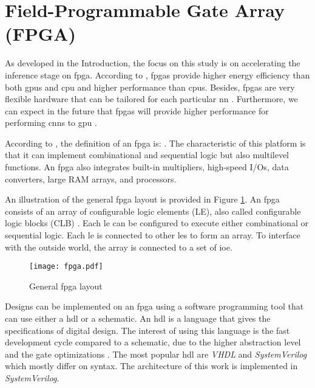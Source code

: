 \section{Field-Programmable Gate Array (FPGA)} \label{sec:fpga}
%
%
As developed in the Introduction, the focus on this study is on accelerating the inference stage on \acrshort{fpga}. According to \textcite{mittal_survey_2015}, \acrshort{fpga}s provide higher energy efficiency than both \acrshort{gpu}s and \acrshort{cpu} and higher performance than \acrshort{cpu}s. Besides, \acrshort{fpga}s are very flexible hardware that can be tailored for each particular \acrshort{nn} \cite{vestias_fast_2019}. Furthermore, we can expect in the future that \acrshort{fpga}s will provide higher performance for performing \acrshort{cnn}s to \acrshort{gpu} \cite{nurvitadhi_can_2017}.

According to \textcite{harris_digital_2015}, the definition of an \acrshort{fpga} is: . The characteristic of this platform is that it can implement combinational and sequential logic but also multilevel functions. An \acrshort{fpga} also integrates built-in multipliers, high-speed I/Os, data converters, large RAM arrays, and processors.

An illustration of the general \acrshort{fpga} layout is provided in Figure \ref{fig:fpga}. An \acrshort{fpga} consists of an array of configurable logic elements (LE), also called configurable logic blocks (CLB) \cite{harris_digital_2015}. Each \acrshort{le} can be configured to execute either combinational or sequential logic. Each \acrshort{le} is connected to other \acrshort{le}s to form an array. To interface with the outside world, the array is connected to a set of \acrfull{ioe}.
%
\begin{figure}[H]
    \centering
    \texttt{[image: fpga.pdf]}
    \caption{General \acrshort{fpga} layout \cite{harris_digital_2015}}
    \label{fig:fpga}
\end{figure}

Designs can be implemented on an \acrshort{fpga} using a software programming tool that can use either a \acrfull{hdl} or a schematic. An \acrshort{hdl} is a language that gives the specifications of digital design. The interest of using this language is the fast development cycle compared to a schematic, due to the higher abstraction level and the gate optimizations \cite{harris_digital_2015}. The most popular \acrshort{hdl} are \textit{VHDL} and \textit{SystemVerilog} which mostly differ on syntax. The architecture of this work is implemented in \textit{SystemVerilog}. 

